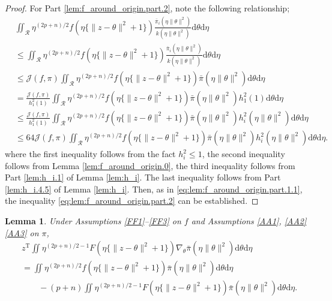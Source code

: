 \documentclass[preprint,11pt]{imsart}
\numberwithin{equation}{section}
\theoremstyle{plain}
\newtheorem{lemma}{Lemma}[section]
\theoremstyle{definition}
\theoremstyle{remark}
\def\T{{ \mathrm{\scriptscriptstyle T} }}
\newcommand{\rd}{\mathrm{d}}
\begin{document}
\begin{proof}
 For Part \ref{lem:f_around_origin.part.2}, note the following relationship;
 \begin{align*}
  &\iint_\mathcal{R}   \eta^{(2p+n)/2} f(\eta\{\|z-\theta\|^2+1\})
  \frac{\bar{\pi}_i(\eta\|\theta\|^2)}{k(\eta\|\theta\|^2)} \rd \theta   \rd \eta \\
  &\leq \iint_\mathcal{R}   \eta^{(2p+n)/2} f(\eta\{\|z-\theta\|^2+1\})
  \frac{\bar{\pi}_i(\eta\|\theta\|^2)}{k(\eta\|\theta\|^2)} \rd \theta   \rd \eta \\
&\leq \mathcal{J}(f,\pi)\iint_\mathcal{R}   \eta^{(2p+n)/2} f(\eta\{\|z-\theta\|^2+1\}) \bar{\pi}(\eta\|\theta\|^2) \rd \theta   \rd \eta \\
 &= \frac{\mathcal{J}(f,\pi)}{h_1^2(1)}\iint_\mathcal{R}   \eta^{(2p+n)/2} f(\eta\{\|z-\theta\|^2+1\}) \bar{\pi}(\eta\|\theta\|^2)
 h_1^2(1)\rd \theta   \rd \eta \\
 &\leq \frac{\mathcal{J}(f,\pi)}{h_1^2(1)}\iint_\mathcal{R}   \eta^{(2p+n)/2} f(\eta\{\|z-\theta\|^2+1\}) \bar{\pi}(\eta\|\theta\|^2)
 h_i^2(\eta\|\theta\|^2)\rd \theta   \rd \eta \\
 &\leq 64\mathcal{J}(f,\pi)\iint_\mathcal{R}   \eta^{(2p+n)/2} f(\eta\{\|z-\theta\|^2+1\}) \bar{\pi}(\eta\|\theta\|^2)
 h_i^2(\eta\|\theta\|^2)\rd \theta   \rd \eta.
 \end{align*}
 where the first inequality follows from the fact $h_i^2\leq 1$, the second inequality follows from
 Lemma \ref{lem:f_around_origin.0}, the third inequality follows from Part \ref{lem:h_i.1}
 of Lemma \ref{lem:h_i}.
The last inequality follows from Part \ref{lem:h_i.4.5} of Lemma \ref{lem:h_i}.
 Then, as in \eqref{eq:lem:f_around_origin.part.1.1},
 the inequality \eqref{eq:lem:f_around_origin.part.2} can be established.
\end{proof}

\begin{lemma}\label{lem:general_integration_by_parts}
Under Assumptions \ref{FF1}--\ref{FF3} on $f$ and Assumptions \ref{AA1}, \ref{AA2}  \ref{AA3} on $\pi$,  
 \begin{align*}
& z^\T\iint 
  \eta^{(2p+n)/2-1} F(\eta\{\|z-\theta\|^2+1\}) 
\nabla_\theta \bar{\pi}(\eta\|\theta\|^2) \rd \theta   \rd \eta \\
& =\iint 
 \eta^{(2p+n)/2} f(\eta\{\|z-\theta\|^2+1\}) \bar{\pi}(\eta\|\theta\|^2) \rd \theta   \rd \eta \\
&\qquad -(p+n)\iint 
\eta^{(2p+n)/2-1} F(\eta\{\|z-\theta\|^2+1\}) \bar{\pi}(\eta\|\theta\|^2) \rd \theta   \rd \eta .
 \end{align*}
\end{lemma}
\end{document}
